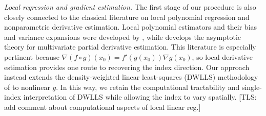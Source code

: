 \documentclass[11pt]{article}
\newcommand{\tls}[1]{{\color{cyan}[TLS: #1]}}
\begin{document}
\medskip


\emph{Local regression and gradient estimation.}
The first stage of our procedure is also closely connected to the classical literature on local polynomial regression and nonparametric derivative estimation. Local polynomial estimators and their bias and variance expansions were developed by \citet{ruppert1994multivariate}, while \citet{lu1996partial} develops the asymptotic theory for multivariate partial derivative estimation. This literature is especially pertinent because $\nabla(f\circ g)(x_0)=f'(g(x_0))\nabla g(x_0)$, so local derivative estimation provides one route to recovering the index direction. Our approach instead extends the density-weighted linear least-squares (DWLLS) methodology of \citet{Newey_Ruud_2005} to nonlinear $g$. In this way, we retain the computational tractability and single-index interpretation of DWLLS while allowing the index to vary spatially. \tls{add comment about computational aspects of local linear reg.}

\medskip



\end{document}
